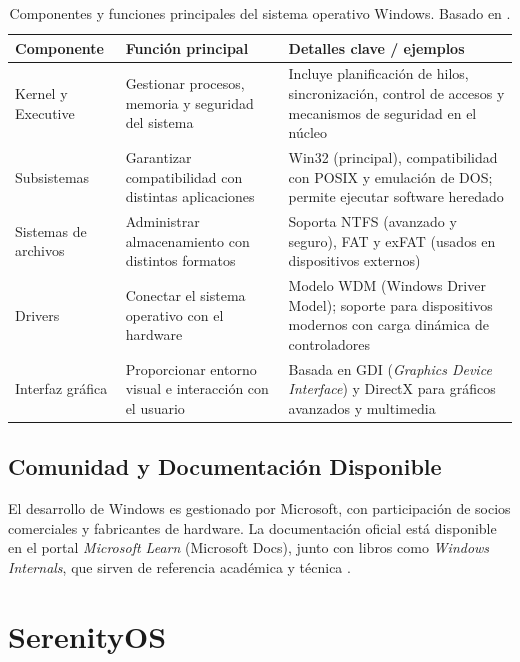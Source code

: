 \begin{table}[H]
\centering
\begin{tabular}{p{3.2cm}p{5cm}p{6cm}}
\hline
\textbf{Componente} & \textbf{Función principal} & \textbf{Detalles clave / ejemplos} \\
\hline
Kernel y Executive & Gestionar procesos, memoria y seguridad del sistema & Incluye planificación de hilos, sincronización, control de accesos y mecanismos de seguridad en el núcleo \\
\hline
Subsistemas & Garantizar compatibilidad con distintas aplicaciones & Win32 (principal), compatibilidad con POSIX y emulación de DOS; permite ejecutar software heredado \\
\hline
Sistemas de archivos & Administrar almacenamiento con distintos formatos & Soporta NTFS (avanzado y seguro), FAT y exFAT (usados en dispositivos externos) \\
\hline
Drivers & Conectar el sistema operativo con el hardware & Modelo WDM (Windows Driver Model); soporte para dispositivos modernos con carga dinámica de controladores \\
\hline
Interfaz gráfica & Proporcionar entorno visual e interacción con el usuario & Basada en GDI (\textit{Graphics Device Interface}) y DirectX para gráficos avanzados y multimedia \\
\hline
\end{tabular}
\caption[Componentes y funciones clave de Windows]{Componentes y funciones principales del sistema operativo Windows. Basado en \textcite{russinovich}.}
\label{tab:componentes-windows}
\end{table}


\subsection{Comunidad y Documentación Disponible}
El desarrollo de Windows es gestionado por Microsoft, con participación de socios comerciales y fabricantes 
de hardware. La documentación oficial está disponible en el portal \textit{Microsoft Learn} (Microsoft Docs), 
junto con libros como \textit{Windows Internals}, que sirven de referencia académica y técnica \parencite{microsoftdocs}.
 

\section{SerenityOS}

